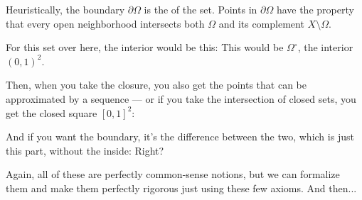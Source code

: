 \begin{content}

\begin{steps}
Heuristically, the boundary $\partial\Omega$ is the  of the set. Points in $\partial\Omega$ have the property that every open neighborhood intersects both $\Omega$ and its complement $X \setminus \Omega$.
\end{steps}
\end{content}

\begin{speech}[00:33:29 - 00:35:04]
For this set over here, the interior would be this:  This would be $\Omega^\circ$, the interior $(0, 1)^2$. 

Then, when you take the closure, you also get the points that can be approximated by a sequence --- or if you take the intersection of closed sets, you get the closed square $[0, 1]^2$: 

And if you want the boundary, it's the difference between the two, which is just this part, without the inside:  Right?

Again, all of these are perfectly common-sense notions, but we can formalize them and make them perfectly rigorous just using these few axioms. And then... 
\end{speech}

